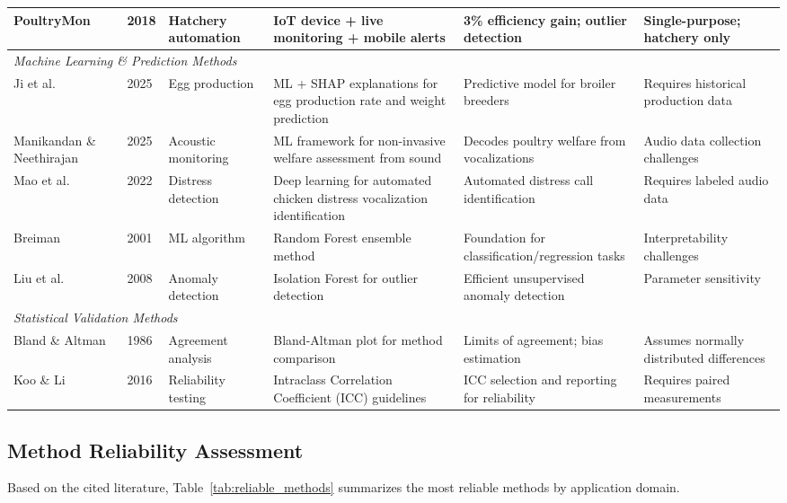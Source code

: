 \documentclass[../main.tex]{subfiles}
\begin{document}
\begin{table}[h!]
{\begin{tabular}{p{2.2cm}p{0.6cm}p{2.5cm}p{4.5cm}p{3cm}p{4.2cm}}
\hline
PoultryMon \cite{yourstory2018poultrymon} & 2018 & Hatchery automation & IoT device + live monitoring + mobile alerts & 3\% efficiency gain; outlier detection & Single-purpose; hatchery only \\
\hline
\multicolumn{6}{l}{\textit{Machine Learning \& Prediction Methods}} \\
\hline
Ji et al. \cite{ji2025egg} & 2025 & Egg production & ML + SHAP explanations for egg production rate and weight prediction & Predictive model for broiler breeders & Requires historical production data \\
\hline
Manikandan \& Neethirajan \cite{manikandan2025acoustic} & 2025 & Acoustic monitoring & ML framework for non-invasive welfare assessment from sound & Decodes poultry welfare from vocalizations & Audio data collection challenges \\
\hline
Mao et al. \cite{mao2022distress} & 2022 & Distress detection & Deep learning for automated chicken distress vocalization identification & Automated distress call identification & Requires labeled audio data \\
\hline
Breiman \cite{breiman2001rf} & 2001 & ML algorithm & Random Forest ensemble method & Foundation for classification/regression tasks & Interpretability challenges \\
\hline
Liu et al. \cite{liu2008iforest} & 2008 & Anomaly detection & Isolation Forest for outlier detection & Efficient unsupervised anomaly detection & Parameter sensitivity \\
\hline
\multicolumn{6}{l}{\textit{Statistical Validation Methods}} \\
\hline
Bland \& Altman \cite{bland1986agreement} & 1986 & Agreement analysis & Bland-Altman plot for method comparison & Limits of agreement; bias estimation & Assumes normally distributed differences \\
\hline
Koo \& Li \cite{koo2016icc} & 2016 & Reliability testing & Intraclass Correlation Coefficient (ICC) guidelines & ICC selection and reporting for reliability & Requires paired measurements \\
\hline
\end{tabular}%
}
\end{table}

\subsection{Method Reliability Assessment}

Based on the cited literature, Table~\ref{tab:reliable_methods} summarizes the most reliable methods by application domain.
\end{document}

